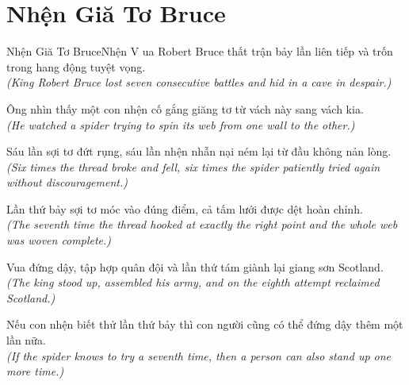 \section{Nhện Giă Tơ Bruce}
\begin{truyen}{Nhện Giă Tơ Bruce}{Nhện}
V ua Robert Bruce thất trận bảy lần liên tiếp và trốn trong hang động tuyệt vọng.\\
\textit{(King Robert Bruce lost seven consecutive battles and hid in a cave in despair.)}

Ông nhìn thấy một con nhện cố gắng giăng tơ từ vách này sang vách kia.\\
\textit{(He watched a spider trying to spin its web from one wall to the other.)}

Sáu lần sợi tơ đứt rụng, sáu lần nhện nhẫn nại ném lại từ đầu không nản lòng.\\
\textit{(Six times the thread broke and fell, six times the spider patiently tried again without discouragement.)}

Lần thứ bảy sợi tơ móc vào đúng điểm, cả tấm lưới được dệt hoàn chỉnh.\\
\textit{(The seventh time the thread hooked at exactly the right point and the whole web was woven complete.)}

Vua đứng dậy, tập hợp quân đội và lần thứ tám giành lại giang sơn Scotland.\\
\textit{(The king stood up, assembled his army, and on the eighth attempt reclaimed Scotland.)}

\end{truyen}
\begin{baihoc}
  Nếu con nhện biết thử lần thứ bảy thì con người cũng có thể đứng dậy thêm một lần nữa.\\
  \textit{(If the spider knows to try a seventh time, then a person can also stand up one more time.)}
\end{baihoc}

